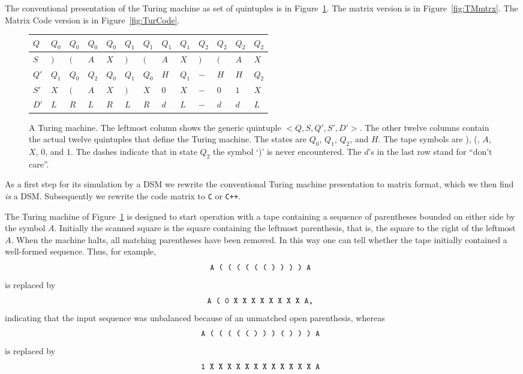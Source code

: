 \documentclass[preprint,11pt]{elsarticle}
\begin{document}
The conventional presentation of the Turing machine
as set of quintuples
is in Figure~\ref{fig:TM}.
The matrix version is in Figure~\ref{fig:TMmtrx}.
The Matrix Code version is in Figure~\ref{fig:TurCode}.
\begin{figure}[htbp]
\begin{center}
\begin{minipage}{4.5in}
\begin{tabular}{l||l|l|l|l|l|l|l|l|l|l|l|l|}
$Q$ &$Q_0$&$Q_0$&$Q_0$&$Q_0$&$Q_1$&$Q_1$&$Q_1$&$Q_1$&$Q_2$&$Q_2$&$Q_2$&$Q_2$\\
\hline
$S$ &$)$&$($&$A$&$X$&$)$&$($&$A$&$X$&$)$&$($&$A$&$X$\\
\hline
$Q'$ &$Q_1$&$Q_0$&$Q_2$&$Q_0$&$Q_1$&$Q_0$&$H$&$Q_1$&$-$&$H$&$H$&$Q_2$ \\
\hline
$S'$ &$X$&$($&$A$&$X$&$)$&$X$&$0$&$X$&$-$&$0$&$1$&$X$\\
\hline
$D'$ &$L$&$R$&$L$&$R$&$L$&$R$&$d$&$L$&$-$&$d$&$d$&$L$
\end{tabular}
\end{minipage}
\end{center}
\caption{\label{fig:TM}
A Turing machine.
The leftmost column shows the generic quintuple
$<Q,S,Q',S',D'>$.
The other twelve columns contain the actual twelve
quintuples that define the Turing machine.
The states are
$Q_0$, $Q_1$, $Q_2$, and $H$.
The tape symbols are ), (, $A$, $X$, $0$, and $1$.
The dashes indicate that in state $Q_2$ the symbol `)'
is never encountered.
The $d$'s in the last row stand for ``don't care''.
}
\end{figure}
As a first step for its simulation by a DSM
we rewrite the conventional Turing machine presentation
to matrix format, which we then find \emph{is} a DSM.
Subsequently we rewrite the code matrix to {\tt C} or {\tt C++}.

\vspace{3mm}

The Turing machine of Figure~\ref{fig:TM}
is designed to start operation with
a tape containing a sequence of parentheses bounded on either
side by the symbol $A$.
Initially the scanned square is
the square containing the leftmost parenthesis,
that is, the square to the right of the leftmost $A$.
When the machine halts,
all matching parentheses have been removed.
In this way one can tell whether the tape initially contained
a well-formed sequence.
Thus, for example,
$$ \mbox{{\tt
A ( ( ( ( ( ( ) ) ) ) A
}}
$$
is replaced by
$$ \mbox{{\tt
A ( 0 X X X X X X X X A, 
}}$$
indicating that the input sequence was unbalanced because
of an unmatched open parenthesis, whereas
$$ \mbox{{\tt
A ( ( ( ( ( ) ) ) ( ) ) ) A 
}}$$
is replaced by
$$ \mbox{{\tt
1 X X X X X X X X X X X X A 
}}$$
\end{document}
